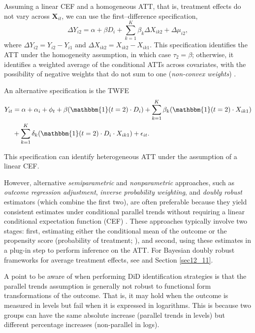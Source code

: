 Assuming a linear CEF and a homogeneous ATT, that is, treatment effects do not vary across $\mathbf{X}_{it}$, we can use the first–difference specification,
\[
\Delta Y_{i2} = \alpha + \beta D_i + \sum_{k=1}^K \beta_k \Delta X_{ik2} + \Delta\mu_{i2},
\]
where $\Delta Y_{i2} = Y_{i2} - Y_{i1}$ and $\Delta X_{ik2} = X_{ik2} - X_{ik1}$. This specification identifies the ATT under the homogeneity assumption, in which case $\tau_2 = \beta$; otherwise, it identifies a weighted average of the conditional ATTs across covariates, with the possibility of negative weights that do not sum to one (\textit{non-convex weights}) \cite{baker2025did_guide}.

An alternative specification is the TWFE
\begin{align*}
	Y_{it} & = \alpha + \alpha_i + \phi_t + \beta (\mathbbm{1}(t=2)\cdot D_i) +   \sum_{k=1}^K \beta_k (\mathbbm{1}(t=2)\cdot X_{ik1})\\
	& +  \sum_{k=1}^K \delta_k (\mathbbm{1}(t=2)\cdot D_i \cdot X_{ik1}) + \epsilon_{it}.
\end{align*}

This specification can identify heterogeneous ATT under the assumption of a linear CEF.


However, alternative \textit{semiparametric} and \textit{nonparametric} approaches, such as \textit{outcome regression adjustment}, \textit{inverse probability weighting}, and \textit{doubly robust} estimators (which combine the first two), are often preferable because they yield consistent estimates under conditional parallel trends without requiring a linear conditional expectation function (CEF) \cite{abadie2005semiparametric,roth2023whats}. These approaches typically involve two stages: first, estimating either the conditional mean of the outcome or the propensity score (probability of treatment; \cite{rosenbaum1983central}), and second, using these estimates in a plug-in step to perform inference on the ATT. For Bayesian doubly robust frameworks for average treatment effects, see \cite{SaarelaBelzileStephens2016,YiuGoudieTom2020,LuoGrahamMcCoy2023,breunig2025double} and Section \ref{sec12_11}.

A point to be aware of when performing DiD identification strategies is that the parallel trends assumption is generally not robust to functional form transformations of the outcome. That is, it may hold when the outcome is measured in levels but fail when it is expressed in logarithms. This is because two groups can have the same absolute increase (parallel trends in levels) but different percentage increases (non-parallel in logs).

